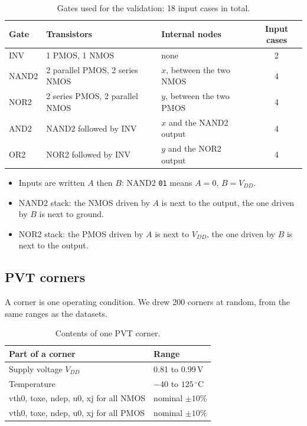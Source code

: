 \documentclass{article}
\begin{document}
\begin{table}[H]
\centering
\begin{tabular}{|l|l|l|c|}
\hline
Gate & Transistors & Internal nodes & Input cases \\
\hline
INV   & 1 PMOS, 1 NMOS                   & none                 & 2 \\
NAND2 & 2 parallel PMOS, 2 series NMOS   & $x$, between the two NMOS & 4 \\
NOR2  & 2 series PMOS, 2 parallel NMOS   & $y$, between the two PMOS & 4 \\
AND2  & NAND2 followed by INV            & $x$ and the NAND2 output  & 4 \\
OR2   & NOR2 followed by INV             & $y$ and the NOR2 output   & 4 \\
\hline
\end{tabular}
\caption{Gates used for the validation: 18 input cases in total.}
\label{tab:gates}
\end{table}

\begin{itemize}
    \item Inputs are written $A$ then $B$: NAND2 \texttt{01} means $A = 0$,
          $B = V_{DD}$.
    \item NAND2 stack: the NMOS driven by $A$ is next to the output, the one
          driven by $B$ is next to ground.
    \item NOR2 stack: the PMOS driven by $A$ is next to $V_{DD}$, the one
          driven by $B$ is next to the output.
\end{itemize}

\subsection{PVT corners}

A corner is one operating condition. We drew 200 corners at random, from the
same ranges as the datasets.

\begin{table}[H]
\centering
\begin{tabular}{|l|l|}
\hline
Part of a corner & Range \\
\hline
Supply voltage $V_{DD}$ & 0.81 to 0.99\,V \\
Temperature & $-40$ to $125\,^\circ$C \\
vth0, toxe, ndep, u0, xj for all NMOS & nominal $\pm 10\%$ \\
vth0, toxe, ndep, u0, xj for all PMOS & nominal $\pm 10\%$ \\
\hline
\end{tabular}
\caption{Contents of one PVT corner.}
\label{tab:corner}
\end{table}
\end{document}
